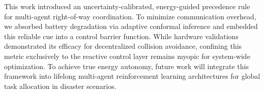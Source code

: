 This work introduced an uncertainty-calibrated, energy-guided precedence rule for multi-agent right-of-way coordination.
To minimize communication overhead, we absorbed battery degradation via adaptive conformal inference and embedded this reliable cue into a control barrier function.
While hardware validations demonstrated its efficacy for decentralized collision avoidance, confining this metric exclusively to the reactive control layer remains myopic for system-wide optimization.
To achieve true energy autonomy, future work will integrate this framework into lifelong multi-agent reinforcement learning architectures for global task allocation in disaster scenarios.